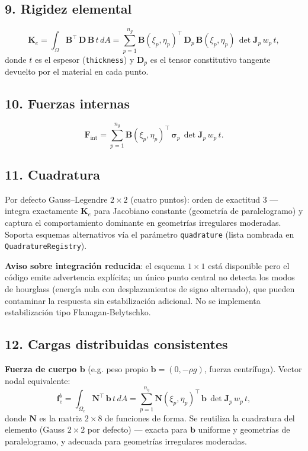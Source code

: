 \documentclass[11pt,letterpaper,oneside]{report}
\begin{document}
\subsection{9. Rigidez elemental}
\[
\mathbf{K}_e = \int_\Omega \mathbf{B}^\top\, \mathbf{D}\, \mathbf{B}\, t\, dA = \sum_{p=1}^{n_g} \mathbf{B}(\xi_p, \eta_p)^\top\, \mathbf{D}_p\, \mathbf{B}(\xi_p, \eta_p)\, \det \mathbf{J}_p\, w_p\, t,
\]
donde $t$ es el espesor (\texttt{thickness}) y $\mathbf{D}_p$ es el tensor constitutivo tangente devuelto por el material en cada punto.

\subsection{10. Fuerzas internas}
\[
\mathbf{F}_{\text{int}} = \sum_{p=1}^{n_g} \mathbf{B}(\xi_p, \eta_p)^\top\, \boldsymbol{\sigma}_p\, \det \mathbf{J}_p\, w_p\, t.
\]

\subsection{11. Cuadratura}
Por defecto Gauss--Legendre $2 \times 2$ (cuatro puntos): orden de exactitud 3 --- integra exactamente $\mathbf{K}_e$ para Jacobiano constante (geometría de paralelogramo) y captura el comportamiento dominante en geometrías irregulares moderadas. Soporta esquemas alternativos vía el parámetro \texttt{quadrature} (lista nombrada en \texttt{QuadratureRegistry}).

\textbf{Aviso sobre integración reducida}: el esquema $1 \times 1$ está disponible pero el código emite advertencia explícita; un único punto central no detecta los modos de hourglass (energía nula con desplazamientos de signo alternado), que pueden contaminar la respuesta sin estabilización adicional. No se implementa estabilización tipo Flanagan-Belytschko.

\subsection{12. Cargas distribuidas consistentes}

\textbf{Fuerza de cuerpo $\mathbf b$} (e.g. peso propio $\mathbf b = (0, -\rho g)$, fuerza centrífuga). Vector nodal equivalente:
\[
\mathbf f_e^{b} = \int_{\Omega_e} \mathbf N^\top\, \mathbf b\, t\, dA = \sum_{p=1}^{n_g} \mathbf N(\xi_p, \eta_p)^\top\, \mathbf b\, \det\mathbf J_p\, w_p\, t,
\]
donde $\mathbf N$ es la matriz $2 \times 8$ de funciones de forma. Se reutiliza la cuadratura del elemento (Gauss $2 \times 2$ por defecto) --- exacta para $\mathbf b$ uniforme y geometrías de paralelogramo, y adecuada para geometrías irregulares moderadas.
\end{document}
